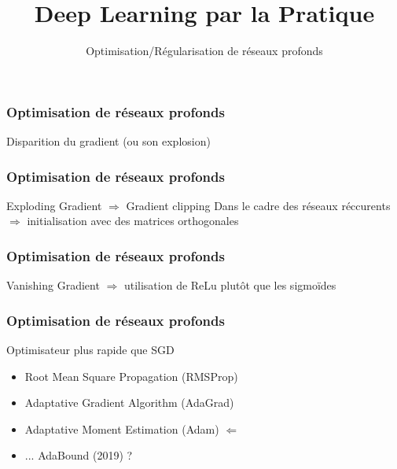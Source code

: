 \documentclass{formation}
\title{Deep Learning par la Pratique}
\subtitle{Optimisation/Régularisation de réseaux profonds}
\begin{document}
\maketitle

\begin{frame}
  \frametitle{Optimisation de réseaux profonds}
  Disparition du gradient (ou son explosion)
\end{frame}

\begin{frame}
  \frametitle{Optimisation de réseaux profonds}
  Exploding Gradient $\Rightarrow$ Gradient clipping
  Dans le cadre des réseaux réccurents $\Rightarrow$ initialisation avec des matrices orthogonales
\end{frame}

\begin{frame}
  \frametitle{Optimisation de réseaux profonds}
  Vanishing Gradient $\Rightarrow$ utilisation de ReLu plutôt que les sigmoïdes
\end{frame}

\begin{frame}
  \frametitle{Optimisation de réseaux profonds}
  Optimisateur plus rapide que SGD
  \begin{itemize}
  \item Root Mean Square Propagation (RMSProp)
  \item Adaptative Gradient Algorithm (AdaGrad)
  \item Adaptative Moment Estimation (Adam)    $\Leftarrow$
  \item ... AdaBound (2019) ?
 \end{itemize}
\end{frame}
\end{document}
